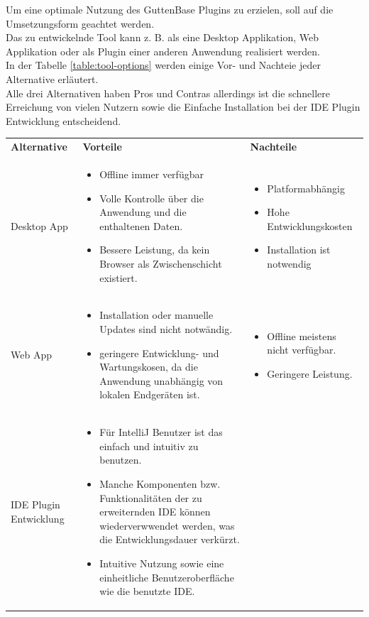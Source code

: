 Um eine optimale Nutzung des GuttenBase Plugins zu erzielen, soll auf die Umsetzungsform geachtet werden.\\
Das zu entwickelnde Tool kann z. B. als eine Desktop Applikation, Web Applikation oder als Plugin einer anderen Anwendung realisiert werden.\\
In der Tabelle \ref{table:tool-options} werden einige Vor- und Nachteie jeder Alternative erläutert. \\
Alle drei Alternativen haben Pros und Contras allerdings ist die schnellere Erreichung von vielen Nutzern sowie die Einfache Installation bei der IDE Plugin Entwicklung entscheidend. 
\begin{table}
	\centering
	\begin{tabular}{ |p{3cm}|p{6cm}|p{6cm}| }
		\hline
		\textbf{Alternative} & \textbf{Vorteile} &  \textbf{Nachteile}  \\
		Desktop App & 
		\begin{itemize}
			\item Offline immer verfügbar
			\item Volle Kontrolle über die Anwendung und die enthaltenen Daten.
			\item Bessere Leistung, da kein Browser als Zwischenschicht existiert.
		\end{itemize}& 
		\begin{itemize}
			\item Platformabhängig
			\item Hohe Entwicklungskosten
			\item Installation ist notwendig
		\end{itemize} \\
		\hline
		Web App &
		
		\begin{itemize}
			\item Installation oder manuelle Updates sind nicht notwändig. 
			\item geringere Entwicklung- und Wartungskosen, da die Anwendung unabhängig von lokalen Endgeräten ist.
		\end{itemize} &
		
		\begin{itemize}
			\item Offline meistens nicht verfügbar.
			\item Geringere Leistung.
		\end{itemize} \\
		\hline
		IDE Plugin Entwicklung &
		
		\begin{itemize}
			\item Für IntelliJ Benutzer ist das einfach und intuitiv zu benutzen.
			\item Manche Komponenten bzw. Funktionalitäten der zu erweiternden IDE können wiederverwwendet werden, was die Entwicklungsdauer verkürzt.
			\item Intuitive Nutzung sowie eine einheitliche Benutzeroberfläche wie die benutzte IDE.
		\end{itemize} &
		

\end{tabular}
\end{table}
